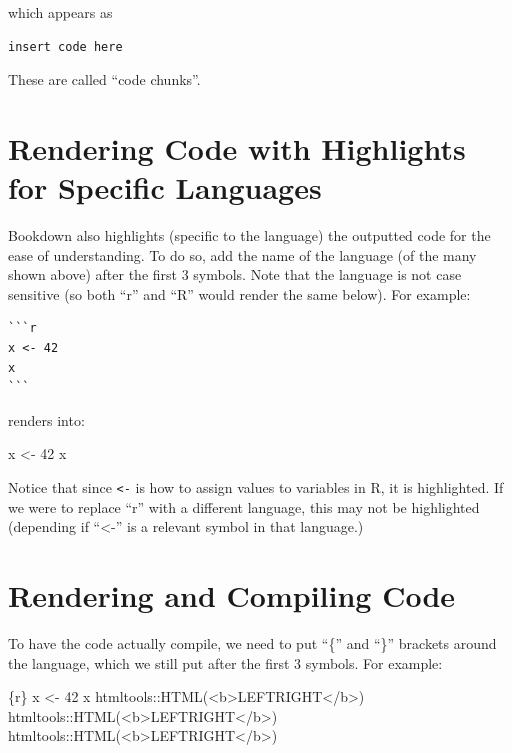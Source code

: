 \documentclass[
]{book}
\newenvironment{Shaded}{\begin{snugshade}}{\end{snugshade}}
\newcommand{\DecValTok}[1]{\textcolor[rgb]{0.00,0.00,0.81}{#1}}
\newcommand{\NormalTok}[1]{#1}
\newcommand{\OtherTok}[1]{\textcolor[rgb]{0.56,0.35,0.01}{#1}}
\theoremstyle{definition}
\theoremstyle{definition}
\theoremstyle{definition}
\theoremstyle{definition}
\theoremstyle{remark}
\begin{document}
which appears as

\begin{verbatim}
insert code here
\end{verbatim}

These are called ``code chunks''.

\section{Rendering Code with Highlights for Specific Languages}\label{rendering-code-with-highlights-for-specific-languages}

Bookdown also highlights (specific to the language) the outputted code for the ease of understanding. To do so, add the name of the language (of the many shown above) after the first 3 \texttt{\textasciigrave{}} symbols. Note that the language is not case sensitive (so both ``r'' and ``R'' would render the same below). For example:

\begin{verbatim}
```r
x <- 42
x
```
\end{verbatim}

renders into:

\begin{Shaded}
\begin{Highlighting}[]
\NormalTok{x }\OtherTok{\textless{}{-}} \DecValTok{42}
\NormalTok{x}
\end{Highlighting}
\end{Shaded}

Notice that since \texttt{\textless{}-} is how to assign values to variables in R, it is highlighted. If we were to replace ``r'' with a different language, this may not be highlighted (depending if ``\textless-'' is a relevant symbol in that language.)

\section{Rendering and Compiling Code}\label{rendering-and-compiling-code}

To have the code actually compile, we need to put ``\{'' and ``\}'' brackets around the language, which we still put after the first 3 \texttt{\textasciigrave{}} symbols. For example:

\begin{Shaded}
\begin{Highlighting}[]
\NormalTok{\textasciigrave{}\textasciigrave{}\textasciigrave{}\{r\}}
\NormalTok{x \textless{}{-} 42}
\NormalTok{x}
\NormalTok{htmltools::HTML(\textquotesingle{}\textless{}b\textgreater{}LEFT\textasciigrave{}RIGHT\textless{}/b\textgreater{}\textquotesingle{}) htmltools::HTML(\textquotesingle{}\textless{}b\textgreater{}LEFT\textasciigrave{}RIGHT\textless{}/b\textgreater{}\textquotesingle{}) htmltools::HTML(\textquotesingle{}\textless{}b\textgreater{}LEFT\textasciigrave{}RIGHT\textless{}/b\textgreater{}\textquotesingle{})}
\NormalTok{\textasciigrave{}\textasciigrave{}\textasciigrave{}}
\end{Highlighting}
\end{Shaded}
\end{document}
